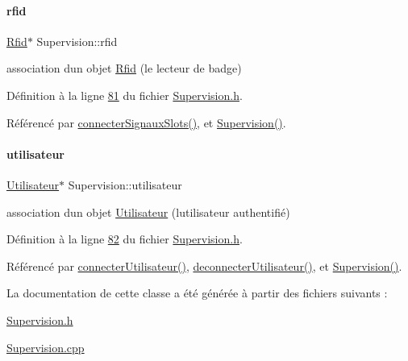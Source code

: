 \mbox{\label{class_supervision_a3ec5986105208e9a2b02b7e97bf61090}} 
\paragraph{\texorpdfstring{rfid}{rfid}}
{\footnotesize\ttfamily \hyperlink{class_rfid}{Rfid}$\ast$ Supervision\+::rfid\hspace{0.3cm}{\ttfamily [private]}}



association d\textquotesingle{}un objet \hyperlink{class_rfid}{Rfid} (le lecteur de badge) 



Définition à la ligne \hyperlink{_supervision_8h_source_l00081}{81} du fichier \hyperlink{_supervision_8h_source}{Supervision.\+h}.



Référencé par \hyperlink{_supervision_8cpp_source_l00273}{connecter\+Signaux\+Slots()}, et \hyperlink{_supervision_8cpp_source_l00036}{Supervision()}.

\mbox{\label{class_supervision_a92384f2b12b2549cee988f83add8ad49}} 
\paragraph{\texorpdfstring{utilisateur}{utilisateur}}
{\footnotesize\ttfamily \hyperlink{class_utilisateur}{Utilisateur}$\ast$ Supervision\+::utilisateur\hspace{0.3cm}{\ttfamily [private]}}



association d\textquotesingle{}un objet \hyperlink{class_utilisateur}{Utilisateur} (l\textquotesingle{}utilisateur authentifié) 



Définition à la ligne \hyperlink{_supervision_8h_source_l00082}{82} du fichier \hyperlink{_supervision_8h_source}{Supervision.\+h}.



Référencé par \hyperlink{_supervision_8cpp_source_l00256}{connecter\+Utilisateur()}, \hyperlink{_supervision_8cpp_source_l00076}{deconnecter\+Utilisateur()}, et \hyperlink{_supervision_8cpp_source_l00036}{Supervision()}.



La documentation de cette classe a été générée à partir des fichiers suivants \+:\begin{DoxyCompactItemize}
\item 
\hyperlink{_supervision_8h}{Supervision.\+h}\item 
\hyperlink{_supervision_8cpp}{Supervision.\+cpp}\end{DoxyCompactItemize}
